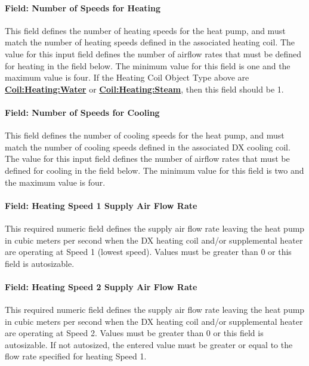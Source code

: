 \paragraph{Field: Number of Speeds for Heating}\label{field-number-of-speeds-for-heating-1}

This field defines the number of heating speeds for the heat pump, and must match the number of heating speeds defined in the associated heating coil. The value for this input field defines the number of airflow rates that must be defined for heating in the field below. The minimum value for this field is one and the maximum value is four. If the Heating Coil Object Type above are \textbf{\hyperref[coilheatingwater]{Coil:Heating:Water}} or \textbf{\hyperref[coilheatingsteam]{Coil:Heating:Steam}}, then this field should be 1.

\paragraph{Field: Number of Speeds for Cooling}\label{field-number-of-speeds-for-cooling-1}

This field defines the number of cooling speeds for the heat pump, and must match the number of cooling speeds defined in the associated DX cooling coil. The value for this input field defines the number of airflow rates that must be defined for cooling in the field below. The minimum value for this field is two and the maximum value is four.

\paragraph{Field: Heating Speed 1 Supply Air Flow Rate}\label{field-heating-speed-1-supply-air-flow-rate}

This required numeric field defines the supply air flow rate leaving the heat pump in cubic meters per second when the DX heating coil and/or supplemental heater are operating at Speed 1 (lowest speed). Values must be greater than 0 or this field is autosizable.

\paragraph{Field: Heating Speed 2 Supply Air Flow Rate}\label{field-heating-speed-2-supply-air-flow-rate}

This required numeric field defines the supply air flow rate leaving the heat pump in cubic meters per second when the DX heating coil and/or supplemental heater are operating at Speed 2. Values must be greater than 0 or this field is autosizable. If not autosized, the entered value must be greater or equal to the flow rate specified for heating Speed 1.

